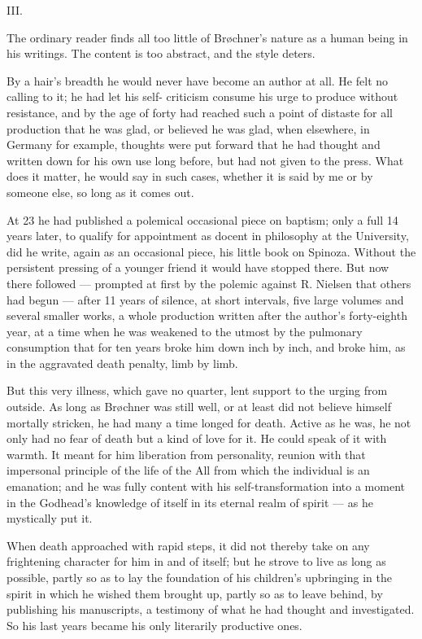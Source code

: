 \documentclass[12pt,a4paper,openany]{book}
\newcommand{\opage}[1]{\marginnote{\footnotesize\textit{[#1]}}}
\newcommand{\sectionnum}[1]{\begin{center}#1\end{center}}
\begin{document}
\sectionnum{III.}

The ordinary reader finds all too little of Brøchner's nature as a human being
in his writings. The content is too abstract, and the style deters.

By a hair's breadth he would never have become an author at all. He felt no
calling to it; he had let his self-
\opage{243}criticism consume his urge to produce without resistance, and by the age of
forty had reached such a point of distaste for all production that he was
glad, or believed he was glad, when elsewhere, in Germany for example, thoughts
were put forward that he had thought and written down for his own use long
before, but had not given to the press. What does it matter, he would say in
such cases, whether it is said by me or by someone else, so long as it comes
out.

At 23 he had published a polemical occasional piece on baptism; only a full
14 years later, to qualify for appointment as docent in philosophy at the
University, did he write, again as an occasional piece, his little book on
Spinoza. Without the persistent pressing of a younger friend it would have
stopped there. But now there followed --- prompted at first by the polemic
against R. Nielsen that others had begun --- after 11 years of silence, at
short intervals, five large volumes and several smaller works, a whole
production written after the author's forty-eighth year, at a time when he was
weakened to the utmost by the pulmonary consumption that for ten years broke
him down inch by inch, and broke him, as in the aggravated death penalty, limb
by limb.

But this very illness, which gave
\opage{244}no quarter, lent support to the urging from outside. As long as Brøchner was
still well, or at least did not believe himself mortally stricken, he had many
a time longed for death. Active as he was, he not only had no fear of death
but a kind of love for it. He could speak of it with warmth. It meant for him
liberation from personality, reunion with that impersonal principle of the
life of the All from which the individual is an emanation; and he was fully
content with his self-transformation into a moment in the Godhead's knowledge
of itself in its eternal realm of spirit --- as he mystically put it.

When death approached with rapid steps, it did not thereby take on any
frightening character for him in and of itself; but he strove to live as long
as possible, partly so as to lay the foundation of his children's upbringing in
the spirit in which he wished them brought up, partly so as to leave behind, by
publishing his manuscripts, a testimony of what he had thought and
investigated. So his last years became his only literarily productive ones.
\end{document}
